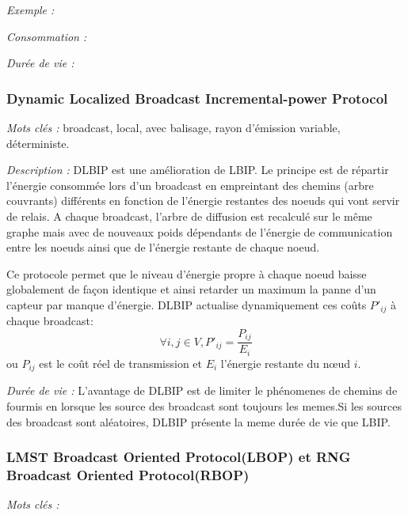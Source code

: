 
\emph{Exemple :} 

\emph{Consommation :} 

\emph{Durée de vie :} 



\subsubsection{Dynamic Localized Broadcast Incremental-power Protocol \cite{Champ2009DLBIP}}
\emph{Mots clés :} broadcast, local, avec balisage, rayon d'émission variable, déterministe.

\emph{Description :} DLBIP est une amélioration de LBIP. Le principe est de répartir l'énergie consommée lors d'un broadcast en empreintant des chemins (arbre couvrants) différents en fonction de l'énergie restantes des noeuds qui vont servir de relais. A chaque broadcast, l'arbre de diffusion est recalculé sur le même graphe mais avec de nouveaux poids dépendants de l'énergie de communication entre les noeuds ainsi que de l'énergie restante de chaque noeud.

Ce protocole permet que le niveau d'énergie propre à chaque noeud baisse globalement de façon identique et ainsi retarder un maximum la panne d'un capteur par manque d'énergie.
DLBIP actualise dynamiquement ces coûts $P'_{ij}$ à chaque broadcast:
$$ \forall i,j \in V, P'_{ij}=\frac{P_{ij}}{E_i}$$
ou $P_{ij}$ est le coût réel de transmission et $E_i$ l'énergie restante du nœud $i$.




\emph{Durée de vie :} L'avantage de DLBIP est de limiter le phénomenes de chemins de fourmis en lorsque les source des broadcast sont toujours les memes.Si les sources des broadcast sont aléatoires, 
DLBIP présente la meme durée de vie que LBIP.





\subsubsection{LMST Broadcast Oriented Protocol(LBOP) et  RNG Broadcast Oriented Protocol(RBOP) \cite{Cartigny2005}}
\emph{Mots clés :} 

